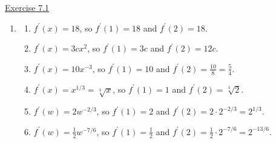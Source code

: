 \underline{Exercise 7.1}
\begin{enumerate}
\item[3.]
\begin{enumerate}
\item[(a)] $f^{\prime}(x)=18$, so $f^{\prime}(1)=18$ and $f^{\prime}(2)=18$.
\item[(b)] $f^{\prime}(x)=3 c x^{2}$, so $f^{\prime}(1)=3 c$ and $f^{\prime}(2)=12 c$.
\item[(c)] $f^{\prime}(x)=10 x^{-3}$, so $f^{\prime}(1)=10$ and $f^{\prime}(2)=\frac{10}{8}=\frac{5}{4}$.
\item[(d)] $f^{\prime}(x)=x^{1 / 3}=\sqrt[3]{x}$, so $f^{\prime}(1)=1$ and $f^{\prime}(2)=\sqrt[3]{2}$.
\item[(e)] $f^{\prime}(w)=2 w^{-2 / 3}$, so $f^{\prime}(1)=2$ and $f^{\prime}(2)=2 \cdot 2^{-2 / 3}=2^{1 / 3}$.
\item[(f)] $f^{\prime}(w)=\frac{1}{2} w^{-7 / 6}$, so $f^{\prime}(1)=\frac{1}{2}$ and $f^{\prime}(2)=\frac{1}{2} \cdot 2^{-7 / 6}=2^{-13 / 6}$.
\end{enumerate}
\end{enumerate}

